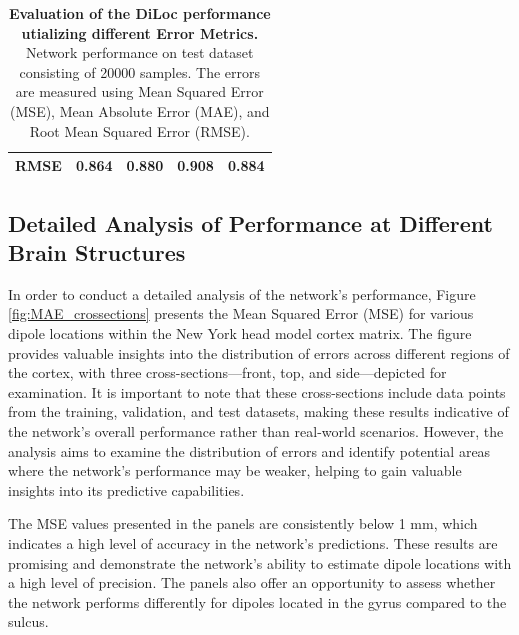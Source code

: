 \documentclass[a4paper, UKenglish, 11pt]{uiomaster}
\begin{document}
\begin{table}[!htb]
\begin{tabular}{l|cccc|}
\multicolumn{1}{|l|}{\cellcolor[HTML]{EFEFEF}RMSE} & \multicolumn{1}{c|}{0.864}                                                                                  & \multicolumn{1}{c|}{0.880}                                                                                   & \multicolumn{1}{c|}{0.908}                                                                                   & 0.884                                                                                                              \\ \hline
\end{tabular}
\caption{\textbf{Evaluation of the DiLoc performance utializing different Error Metrics.} \newline
Network performance on test dataset consisting of 20000 samples. The errors are measured using Mean Squared Error (MSE), Mean Absolute Error (MAE), and Root Mean Squared Error (RMSE).}
\label{table:error_simple_dipole}
\end{table}

\subsection{Detailed Analysis of Performance at Different Brain Structures}
In order to conduct a detailed analysis of the network's performance, Figure \ref{fig:MAE_crossections} presents the Mean Squared Error (MSE) for various dipole locations within the New York head model cortex matrix. The figure provides valuable insights into the distribution of errors across different regions of the cortex, with three cross-sections—front, top, and side—depicted for examination. It is important to note that these cross-sections include data points from the training, validation, and test datasets, making these results indicative of the network's overall performance rather than real-world scenarios. However, the analysis aims to examine the distribution of errors and identify potential areas where the network's performance may be weaker, helping to gain valuable insights into its predictive capabilities.

The MSE values presented in the panels are consistently below 1 mm, which indicates a high level of accuracy in the network's predictions. These results are promising and demonstrate the network's ability to estimate dipole locations with a high level of precision. The panels also offer an opportunity to assess whether the network performs differently for dipoles located in the gyrus compared to the sulcus.
\end{document}
